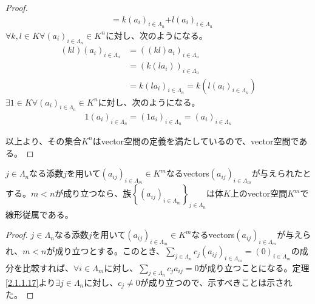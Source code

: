 \documentclass[dvipdfmx]{jsarticle}
\begin{document}
\begin{proof}
\begin{align*}
&= k\left( a_{i} \right)_{i \in \varLambda_{n}}\mathbf{+}l\left( a_{i} \right)_{i \in \varLambda_{n}}
\end{align*}
$\forall k,l \in K\forall\left( a_{i} \right)_{i \in \varLambda_{n}} \in K^{n}$に対し、次のようになる。
\begin{align*}
(kl)\left( a_{i} \right)_{i \in \varLambda_{n}} &= \left( (kl)a_{i} \right)_{i \in \varLambda_{n}}\\
&= \left( k\left( la_{i} \right) \right)_{i \in \varLambda_{n}}\\
&= {k\left( la_{i} \right)}_{i \in \varLambda_{n}} = k\left( l\left( a_{i} \right)_{i \in \varLambda_{n}} \right)
\end{align*}
$\exists 1 \in K\forall\left( a_{i} \right)_{i \in \varLambda_{n}} \in K^{n}$に対し、次のようになる。
\begin{align*}
1\left( a_{i} \right)_{i \in \varLambda_{n}} = \left( 1a_{i} \right)_{i \in \varLambda_{n}} = \left( a_{i} \right)_{i \in \varLambda_{n}}
\end{align*}\par
以上より、その集合$K^{n}$はvector空間の定義を満たしているので、vector空間である。
\end{proof}
\begin{thm}\label{2.1.4.2}
$j \in \varLambda_{n}$なる添数$j$を用いて$\left( a_{ij} \right)_{i \in \varLambda_{m}} \in K^{m}$なるvectors$\left( a_{ij} \right)_{i \in \varLambda_{m}}$が与えられたとする。$m < n$が成り立つなら、族$\left\{ \left( a_{ij} \right)_{i \in \varLambda_{m}}\right\}_{j \in \varLambda_{n} } $は体$K$上のvector空間$K^{m}$で線形従属である。
\end{thm}
\begin{proof}
$j \in \varLambda_{n}$なる添数$j$を用いて$\left( a_{ij} \right)_{i \in \varLambda_{m}} \in K^{m}$なるvectors$\left( a_{ij} \right)_{i \in \varLambda_{m}}$が与えられ、$m < n$が成り立つとする。このとき、$\sum_{j \in \varLambda_{n}} {c_{j}\left( a_{ij} \right)_{i \in \varLambda_{m}}} = (0)_{i \in \varLambda_{m}}$の成分を比較すれば、$\forall i \in \varLambda_{m}$に対し、$\sum_{j \in \varLambda_{n}} {c_{j}a_{ij}} = 0$が成り立つことになる。定理\ref{2.1.1.17}より$\exists j \in \varLambda_{n}$に対し、$c_{j} \neq 0$が成り立つので、示すべきことは示された。
\end{proof}
\end{document}
